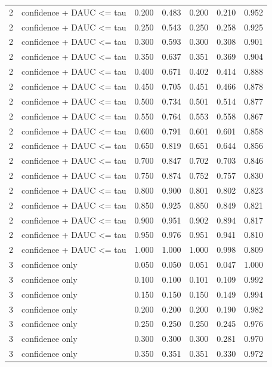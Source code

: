 \begin{tabular}{rlrrrrr}
2 & confidence + DAUC <= tau & 0.200 & 0.483 & 0.200 & 0.210 & 0.952 \\
2 & confidence + DAUC <= tau & 0.250 & 0.543 & 0.250 & 0.258 & 0.925 \\
2 & confidence + DAUC <= tau & 0.300 & 0.593 & 0.300 & 0.308 & 0.901 \\
2 & confidence + DAUC <= tau & 0.350 & 0.637 & 0.351 & 0.369 & 0.904 \\
2 & confidence + DAUC <= tau & 0.400 & 0.671 & 0.402 & 0.414 & 0.888 \\
2 & confidence + DAUC <= tau & 0.450 & 0.705 & 0.451 & 0.466 & 0.878 \\
2 & confidence + DAUC <= tau & 0.500 & 0.734 & 0.501 & 0.514 & 0.877 \\
2 & confidence + DAUC <= tau & 0.550 & 0.764 & 0.553 & 0.558 & 0.867 \\
2 & confidence + DAUC <= tau & 0.600 & 0.791 & 0.601 & 0.601 & 0.858 \\
2 & confidence + DAUC <= tau & 0.650 & 0.819 & 0.651 & 0.644 & 0.856 \\
2 & confidence + DAUC <= tau & 0.700 & 0.847 & 0.702 & 0.703 & 0.846 \\
2 & confidence + DAUC <= tau & 0.750 & 0.874 & 0.752 & 0.757 & 0.830 \\
2 & confidence + DAUC <= tau & 0.800 & 0.900 & 0.801 & 0.802 & 0.823 \\
2 & confidence + DAUC <= tau & 0.850 & 0.925 & 0.850 & 0.849 & 0.821 \\
2 & confidence + DAUC <= tau & 0.900 & 0.951 & 0.902 & 0.894 & 0.817 \\
2 & confidence + DAUC <= tau & 0.950 & 0.976 & 0.951 & 0.941 & 0.810 \\
2 & confidence + DAUC <= tau & 1.000 & 1.000 & 1.000 & 0.998 & 0.809 \\
3 & confidence only & 0.050 & 0.050 & 0.051 & 0.047 & 1.000 \\
3 & confidence only & 0.100 & 0.100 & 0.101 & 0.109 & 0.992 \\
3 & confidence only & 0.150 & 0.150 & 0.150 & 0.149 & 0.994 \\
3 & confidence only & 0.200 & 0.200 & 0.200 & 0.190 & 0.982 \\
3 & confidence only & 0.250 & 0.250 & 0.250 & 0.245 & 0.976 \\
3 & confidence only & 0.300 & 0.300 & 0.300 & 0.281 & 0.970 \\
3 & confidence only & 0.350 & 0.351 & 0.351 & 0.330 & 0.972 \\

\end{tabular}
